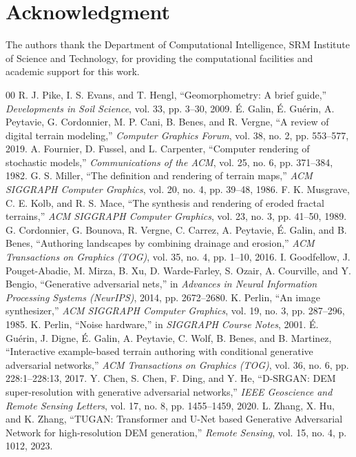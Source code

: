 \documentclass[conference]{IEEEtran}
\begin{document}
\section*{Acknowledgment}
The authors thank the Department of Computational Intelligence, SRM Institute of Science and Technology, for providing the computational facilities and academic support for this work.

\begin{thebibliography}{00}
 R. J. Pike, I. S. Evans, and T. Hengl, ``Geomorphometry: A brief guide,'' \textit{Developments in Soil Science}, vol. 33, pp. 3--30, 2009.
 \'E. Galin, \'E. Gu\'erin, A. Peytavie, G. Cordonnier, M. P. Cani, B. Benes, and R. Vergne, ``A review of digital terrain modeling,'' \textit{Computer Graphics Forum}, vol. 38, no. 2, pp. 553--577, 2019.
 A. Fournier, D. Fussel, and L. Carpenter, ``Computer rendering of stochastic models,'' \textit{Communications of the ACM}, vol. 25, no. 6, pp. 371--384, 1982.
 G. S. Miller, ``The definition and rendering of terrain maps,'' \textit{ACM SIGGRAPH Computer Graphics}, vol. 20, no. 4, pp. 39--48, 1986.
 F. K. Musgrave, C. E. Kolb, and R. S. Mace, ``The synthesis and rendering of eroded fractal terrains,'' \textit{ACM SIGGRAPH Computer Graphics}, vol. 23, no. 3, pp. 41--50, 1989.
 G. Cordonnier, G. Bounova, R. Vergne, C. Carrez, A. Peytavie, \'E. Galin, and B. Benes, ``Authoring landscapes by combining drainage and erosion,'' \textit{ACM Transactions on Graphics (TOG)}, vol. 35, no. 4, pp. 1--10, 2016.
 I. Goodfellow, J. Pouget-Abadie, M. Mirza, B. Xu, D. Warde-Farley, S. Ozair, A. Courville, and Y. Bengio, ``Generative adversarial nets,'' in \textit{Advances in Neural Information Processing Systems (NeurIPS)}, 2014, pp. 2672--2680.
 K. Perlin, ``An image synthesizer,'' \textit{ACM SIGGRAPH Computer Graphics}, vol. 19, no. 3, pp. 287--296, 1985.
 K. Perlin, ``Noise hardware,'' in \textit{SIGGRAPH Course Notes}, 2001.
 \'E. Gu\'erin, J. Digne, \'E. Galin, A. Peytavie, C. Wolf, B. Benes, and B. Martinez, ``Interactive example-based terrain authoring with conditional generative adversarial networks,'' \textit{ACM Transactions on Graphics (TOG)}, vol. 36, no. 6, pp. 228:1--228:13, 2017.
 Y. Chen, S. Chen, F. Ding, and Y. He, ``D-SRGAN: DEM super-resolution with generative adversarial networks,'' \textit{IEEE Geoscience and Remote Sensing Letters}, vol. 17, no. 8, pp. 1455--1459, 2020.
 L. Zhang, X. Hu, and K. Zhang, ``TUGAN: Transformer and U-Net based Generative Adversarial Network for high-resolution DEM generation,'' \textit{Remote Sensing}, vol. 15, no. 4, p. 1012, 2023.

\end{thebibliography}
\end{document}
